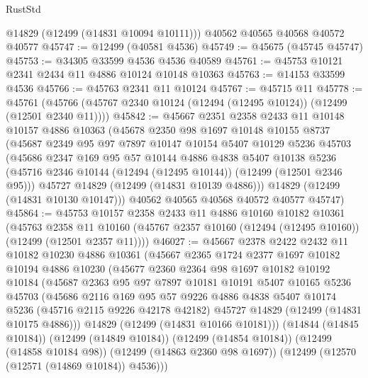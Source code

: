 \begin{lexlean}{RustStd}
\begin{coremodule}
      @14829
      (@12499 (@14831 @10094 @10111)))
    @40562
    @40565
    @40568
    @40572
    @40577
@45747 := @12499 (@40581 @4536)
@45749 := @45675 (@45745 @45747)
@45753 := @34305 @33599 @4536 @4536 @40589
@45761 := @45753 @10121 @2341 @2434 @11 @4886 @10124 @10148 @10363
@45763 := @14153 @33599 @4536
@45766 := @45763 @2341 @11 @10124
@45767 := @45715 @11
@45778 := @45761 (@45766 (@45767 @2340 @10124 (@12494 (@12495 @10124)) (@12499 (@12501 @2340 @11))))
@45842 := @45667
    @2351
    @2358
    @2433
    @11
    @10148
    @10157
    @4886
    @10363
    (@45678
      @2350
      @98
      @1697
      @10148
      @10155
      @8737
      (@45687
        @2349
        @95
        @97
        @7897
        @10147
        @10154
        @5407
        @10129
        @5236
        @45703
        (@45686
          @2347
          @169
          @95
          @57
          @10144
          @4886
          @4838
          @5407
          @10138
          @5236
          (@45716 @2346 @10144 (@12494 (@12495 @10144)) (@12499 (@12501 @2346 @95)))
          @45727
          @14829
          (@12499 (@14831 @10139 @4886)))
        @14829
        (@12499 (@14831 @10130 @10147)))
      @40562
      @40565
      @40568
      @40572
      @40577
      @45747)
@45864 := @45753
    @10157
    @2358
    @2433
    @11
    @4886
    @10160
    @10182
    @10361
    (@45763
      @2358
      @11
      @10160
      (@45767 @2357 @10160 (@12494 (@12495 @10160)) (@12499 (@12501 @2357 @11))))
@46027 := @45667
    @2378
    @2422
    @2432
    @11
    @10182
    @10230
    @4886
    @10361
    (@45667
      @2365
      @1724
      @2377
      @1697
      @10182
      @10194
      @4886
      @10230
      (@45677
        @2360
        @2364
        @98
        @1697
        @10182
        @10192
        @10184
        (@45687
          @2363
          @95
          @97
          @7897
          @10181
          @10191
          @5407
          @10165
          @5236
          @45703
          (@45686
            @2116
            @169
            @95
            @57
            @9226
            @4886
            @4838
            @5407
            @10174
            @5236
            (@45716 @2115 @9226 @42178 @42182)
            @45727
            @14829
            (@12499 (@14831 @10175 @4886)))
          @14829
          (@12499 (@14831 @10166 @10181)))
        (@14844 (@14845 @10184))
        (@12499 (@14849 @10184))
        (@12499 (@14854 @10184))
        (@12499 (@14858 @10184 @98))
        (@12499 (@14863 @2360 @98 @1697))
        (@12499 (@12570 (@12571 (@14869 @10184)) @4536)))

\end{coremodule}
\end{lexlean}

